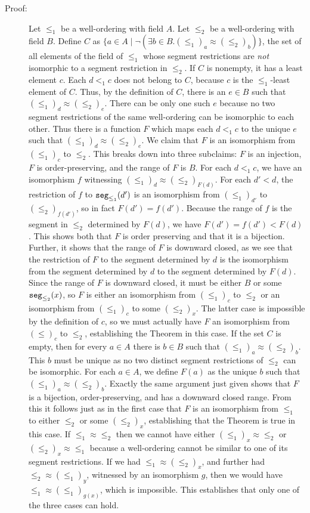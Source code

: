 \documentclass[12pt]{book}
\begin{document}
\begin{description}
\item[Proof:] Let $\leq_1$ be a well-ordering with field $A$.  Let
$\leq_2$ be a well-ordering with field $B$.  Define $C$ as $\{a \in
A\mid \neg(\exists b \in B.(\leq_1)_a \approx (\leq_2)_b)\}$, the set
of all elements of the field of $\leq_1$ whose segment restrictions
are {\em not\/} isomorphic to a segment restriction in $\leq_2$.  If
$C$ is nonempty, it has a least element $c$.  Each $d <_1 c$ does not
belong to $C$, because $c$ is the $\leq_1$-least element of $C$.
Thus, by the definition of $C$, there is an $e \in B$ such that
$(\leq_1)_d \approx (\leq_2)_e$.  There can be only one such $e$ because
no two segment restrictions of the same well-ordering can be
isomorphic to each other.  Thus there is a function $F$ which maps
each $d <_1 c$ to the unique $e$ such that $(\leq_1)_d \approx
(\leq_2)_e$.  We claim that $F$ is an isomorphism from $(\leq_1)_c$ to
$\leq_2$.  This breaks down into three subclaims: $F$ is an injection,
$F$ is order-preserving, and the range of $F$ is $B$.  For each $d <_1
c$, we have an isomorphism $f$ witnessing $(\leq_1)_d \approx
(\leq_2)_{F(d)}$.  For each $d' < d$, the restriction of $f$ to
${\tt seg}_{\leq_1}(d')$ is an isomorphism from $(\leq_1)_{d'}$ to
$(\leq_2)_{f(d')}$, so in fact $F(d') = f(d')$.  Because the range of
$f$ is the segment in $\leq_2$ determined by $F(d)$, we have $F(d') =
f(d') < F(d)$.  This shows both that $F$ is order preserving and that
it is a bijection.  Further, it shows that the range of $F$ is
downward closed, as we see that the restriction of $F$ to the segment
determined by $d$ is the isomorphism from the segment determined by
$d$ to the segment determined by $F(d)$.  Since the range of $F$ is
downward closed, it must be either $B$ or some ${\tt seg}_{\leq_2}(x)$, so $F$ is
either an isomorphism from $(\leq_1)_c$ to $\leq_2$ or an isomorphism
from $(\leq_1)_c$ to some $(\leq_2)_x$.  The latter case is impossible
by the definition of $c$, so we must actually have $F$ an isomorphism
from $(\leq)_c$ to $\leq_2$, establishing the Theorem in this case.
If the set $C$ is empty, then for every $a \in A$ there is $b \in B$
such that $(\leq_1)_a \approx (\leq_2)_b$.  This $b$ must be unique as no
two distinct segment restrictions of $\leq_2$ can be isomorphic.  For
each $a \in A$, we define $F(a)$ as the unique $b$ such that
$(\leq_1)_a \approx (\leq_2)_b$.  Exactly the same argument just given
shows that $F$ is a bijection, order-preserving, and has a downward
closed range.  From this it follows just as in the first case that $F$
is an isomorphism from $\leq_1$ to either $\leq_2$ or some
$(\leq_2)_x$, establishing that the Theorem is true in this case.  If
$\leq_1 \approx \leq_2$ then we cannot have either $(\leq_1)_x \approx
\leq_2$ or $(\leq_2)_x \approx \leq_1$ because a well-ordering cannot be
similar to one of its segment restrictions.  If we had $\leq_1 \approx
(\leq_2)_x$, and further had $\leq_2 \approx (\leq_1)_y$, witnessed by an
isomorphism $g$, then we would have $\leq_1 \approx (\leq_1)_{g(x)}$,
which is impossible.  This establishes that only one of the three
cases can hold.


\end{description}
\end{document}
